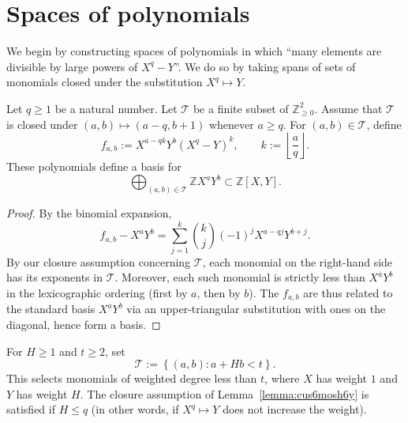\documentclass[reqno]{amsart} 
\begin{document}
\section{Spaces of polynomials}\label{sec:cus71nf9xo}
We begin by constructing spaces of polynomials in which ``many elements are divisible by large powers of $X^q - Y$''.  We do so by taking spans of sets of monomials closed under the substitution $X^q \mapsto Y$.
\begin{lemma}\label{lemma:cus6mosh6y}
  Let $q \geq 1$ be a natural number.  Let $\mathcal{T}$ be a finite subset of $\mathbb{Z}_{\geq 0}^2$.  Assume that $\mathcal{T}$ is closed under $(a, b) \mapsto(a - q, b + 1)$ whenever $a \geq q$.  For $(a, b) \in \mathcal{T}$, define
  \begin{equation*}
    f_{a, b} := X^{a - q k} Y^{b} (X^q - Y)^k,
    \qquad k := \left\lfloor \frac{a}{q} \right\rfloor.
  \end{equation*}
  These polynomials define a basis for
  \begin{equation*}
    \bigoplus_{(a, b) \in \mathcal{T}} \mathbb{Z} X^a Y^b \subset \mathbb{Z}[X, Y].
  \end{equation*}
\end{lemma}
\begin{proof}
  By the binomial expansion,
  \begin{equation*}
    f_{a, b} - X^a Y^b = \sum_{j = 1}^{k} \binom{k}{j} (-1)^j X^{a - q j} Y^{b + j}.
  \end{equation*}
  By our closure assumption concerning $\mathcal{T}$, each monomial on the right-hand side has its exponents in $\mathcal{T}$.  Moreover, each such monomial is strictly less than $X^a Y^b$ in the lexicographic ordering (first by $a$, then by $b$).  The $f_{a, b}$ are thus related to the standard basis $X^a Y^b$ via an upper-triangular substitution with ones on the diagonal, hence form a basis.
\end{proof}

\begin{example}\label{example:cus6mv4c50} 
  For $H \geq 1$ and $t \geq 2$, set
  \begin{equation*}
    \mathcal{T} := \left\{(a, b) : a + H b < t \right\}.
  \end{equation*}
  This selects monomials of weighted degree less than $t$, where $X$ has weight $1$ and $Y$ has weight $H$.  The closure assumption of Lemma~\ref{lemma:cus6mosh6y} is satisfied if $H \leq q$ (in other words, if $X^q \mapsto Y$ does not increase the weight).
\end{example}
\end{document}
